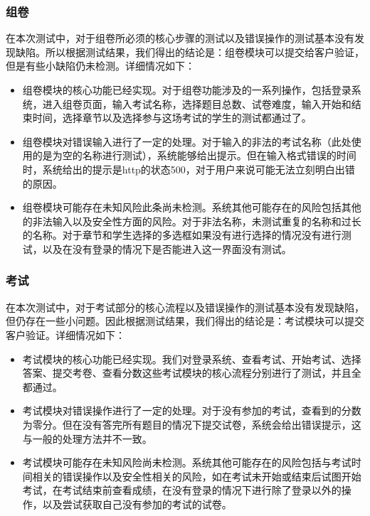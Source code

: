 \documentclass[hyperref, a4paper]{ctexart}
\providecommand{\tightlist}{%
  \setlength{\itemsep}{0pt}\setlength{\parskip}{0pt}}
\begin{document}
\hypertarget{ux7ec4ux5377}{%
\subsubsection{组卷}\label{ux7ec4ux5377}}

在本次测试中，对于组卷所必须的核心步骤的测试以及错误操作的测试基本没有发现缺陷。所以根据测试结果，我们得出的结论是：组卷模块可以提交给客户验证，但是有些小缺陷仍未检测。详细情况如下：

\begin{itemize}
\tightlist
\item
  组卷模块的核心功能已经实现。对于组卷功能涉及的一系列操作，包括登录系统，进入组卷页面，输入考试名称，选择题目总数、试卷难度，输入开始和结束时间，选择章节以及选择参与这场考试的学生的测试都通过了。
\item
  组卷模块对错误输入进行了一定的处理。对于输入的非法的考试名称（此处使用的是为空的名称进行测试），系统能够给出提示。但在输入格式错误的时间时，系统给出的提示是http的状态500，对于用户来说可能无法立刻明白出错的原因。
\item
  组卷模块可能存在未知风险此条尚未检测。系统其他可能存在的风险包括其他的非法输入以及安全性方面的风险。对于非法名称，未测试重复的名称和过长的名称。对于章节和学生选择的多选框如果没有进行选择的情况没有进行测试，以及在没有登录的情况下是否能进入这一界面没有测试。
\end{itemize}

\hypertarget{ux8003ux8bd5}{%
\subsubsection{考试}\label{ux8003ux8bd5}}

在本次测试中，对于考试部分的核心流程以及错误操作的测试基本没有发现缺陷，但仍存在一些小问题。因此根据测试结果，我们得出的结论是：考试模块可以提交客户验证。详细情况如下：

\begin{itemize}
\tightlist
\item
  考试模块的核心功能已经实现。我们对登录系统、查看考试、开始考试、选择答案、提交考卷、查看分数这些考试模块的核心流程分别进行了测试，并且全都通过。
\item
  考试模块对错误操作进行了一定的处理。对于没有参加的考试，查看到的分数为零分。但在没有答完所有题目的情况下提交试卷，系统会给出错误提示，这与一般的处理方法并不一致。
\item
  考试模块可能存在未知风险尚未检测。系统其他可能存在的风险包括与考试时间相关的错误操作以及安全性相关的风险，如在考试未开始或结束后试图开始考试，在考试结束前查看成绩，在没有登录的情况下进行除了登录以外的操作，以及尝试获取自己没有参加的考试的试卷。
\end{itemize}
\end{document}
